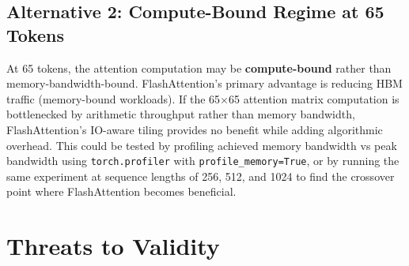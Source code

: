 \documentclass[12pt, a4paper]{article}
\begin{document}
\subsection{Alternative 2: Compute-Bound Regime at 65 Tokens}

At 65 tokens, the attention computation may be \textbf{compute-bound} rather than memory-bandwidth-bound. FlashAttention's primary advantage is reducing HBM traffic (memory-bound workloads). If the 65$\times$65 attention matrix computation is bottlenecked by arithmetic throughput rather than memory bandwidth, FlashAttention's IO-aware tiling provides no benefit while adding algorithmic overhead. This could be tested by profiling achieved memory bandwidth vs peak bandwidth using \texttt{torch.profiler} with \texttt{profile\_memory=True}, or by running the same experiment at sequence lengths of 256, 512, and 1024 to find the crossover point where FlashAttention becomes beneficial.

\section{Threats to Validity}
\end{document}
